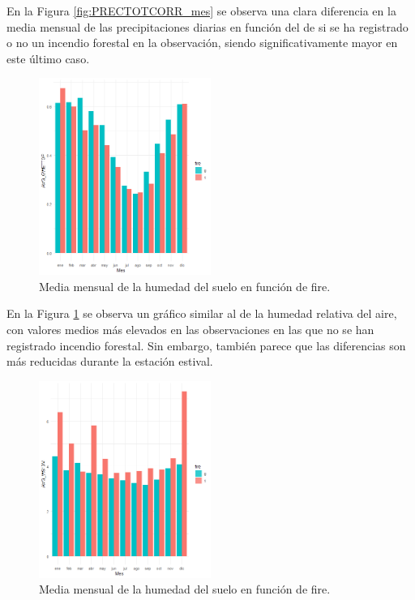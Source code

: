\documentclass[12pt,a4paper,]{book}
\numberwithin{dummy}{section}
\theoremstyle{ocrenumbox}
\theoremstyle{blacknumex}
\theoremstyle{blacknumbox}
\theoremstyle{ocrenum}
\theoremstyle{ocrenum}
\begin{document}
En la Figura \ref{fig:PRECTOTCORR_mes} se observa una clara diferencia
en la media mensual de las precipitaciones diarias en función del de si
se ha registrado o no un incendio forestal en la observación, siendo
significativamente mayor en este último caso.

\begin{figure}[H]
\centering
\includegraphics[width =0.5\textwidth]{graficos/GWETTOP_mes.png}
\caption{Media mensual de la humedad del suelo en función de fire.}
\label{fig:GWETTOP_mes}
\end{figure}

En la Figura \ref{fig:GWETTOP_mes} se observa un gráfico similar al de
la humedad relativa del aire, con valores medios más elevados en las
observaciones en las que no se han registrado incendio forestal. Sin
embargo, también parece que las diferencias son más reducidas durante la
estación estival.

\begin{figure}[H]
\centering
\includegraphics[width = 0.5\textwidth]{graficos/WS10M_mes.png}
\caption{Media mensual de la humedad del suelo en función de fire.}
\label{fig:WS10M_mes}
\end{figure}
\end{document}
